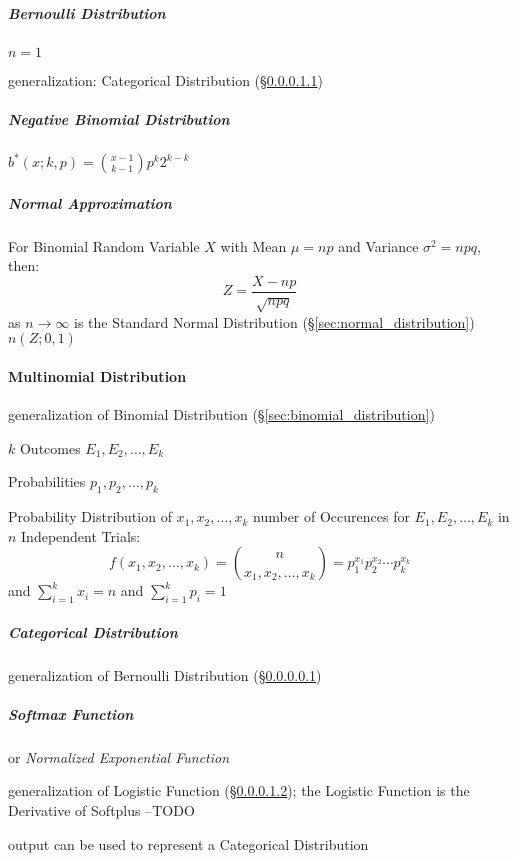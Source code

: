\subparagraph{Bernoulli Distribution}\label{sec:bernoulli_distribution}\hfill

$n = 1$

generalization: Categorical Distribution (\S\ref{sec:categorical_distribution})



\subparagraph{Negative Binomial Distribution}\label{sec:negative_binomial}\hfill

$b^*(x; k,p) = \binom{x-1}{k-1} p^k 2^{k-k}$



\subparagraph{Normal Approximation}\label{sec:normal_approximation}\hfill

For Binomial Random Variable $X$ with Mean $\mu = np$ and Variance
$\sigma^2 = npq$, then:
\[
  Z = \frac{X - np}{\sqrt{npq}}
\]
as $n \rightarrow \infty$ is the Standard Normal Distribution
(\S\ref{sec:normal_distribution}) $n(Z;0,1)$



\paragraph{Multinomial Distribution}\label{sec:multinomial_distribution}\hfill

generalization of Binomial Distribution (\S\ref{sec:binomial_distribution})

$k$ Outcomes $E_1, E_2, \ldots, E_k$

Probabilities $p_1, p_2, \ldots, p_k$

Probability Distribution of $x_1, x_2, \ldots, x_k$ number of
Occurences for $E_1, E_2, \ldots, E_k$ in $n$ Independent Trials:
\[
  f(x_1, x_2, \ldots, x_k) = \binom{n}{x_1, x_2, \ldots, x_k} =
  p_1^{x_1} p_2^{x_2} \cdots p_k^{x_k}
\]
and $\sum_{i=1}^k x_i = n$ and $\sum_{i=1}^k {p_i} = 1$



\subparagraph{Categorical Distribution}\label{sec:categorical_distribution}
\hfill

generalization of Bernoulli Distribution (\S\ref{sec:bernoulli_distribution})



\subparagraph{Softmax Function}\label{sec:softmax}
\hfill

or \emph{Normalized Exponential Function}

generalization of Logistic Function (\S\ref{sec:softmax}); the Logistic Function
is the Derivative of Softplus --TODO

output can be used to represent a Categorical Distribution

